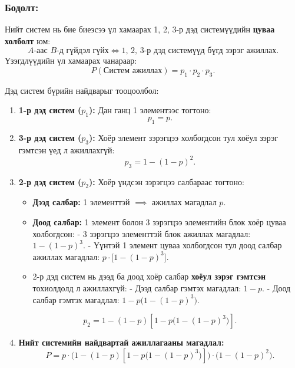 \documentclass[11pt,a4paper]{article}
\begin{document}
\subsubsection*{Бодолт:}

Нийт систем нь бие биеэсээ үл хамаарах 1, 2, 3-р дэд системүүдийн \textbf{цуваа холболт} юм:
\[
  A \text{-аас } B \text{-д гүйдэл гүйх} \iff \text{1, 2, 3-р дэд системүүд бүгд зэрэг ажиллах}.
\]
Үзэгдлүүдийн үл хамаарах чанараар:
\[
  P(\text{Систем ажиллах}) = p_1 \cdot p_2 \cdot p_3.
\]

Дэд систем бүрийн найдварыг тооцоолбол:

\begin{enumerate}[label=\textbf{\arabic*.}, leftmargin=1.4em, itemsep=3pt]
  \item \textbf{1-р дэд систем ($p_1$):}
  Дан ганц 1 элементээс тогтоно:
  \[
    p_1 = p.
  \]

  \item \textbf{3-р дэд систем ($p_3$):}
  Хоёр элемент зэрэгцээ холбогдсон тул хоёул зэрэг гэмтсэн үед л ажиллахгүй:
  \[
    p_3 = 1 - (1 - p)^2.
  \]

  \item \textbf{2-р дэд систем ($p_2$):}
  Хоёр үндсэн зэрэгцээ салбараас тогтоно:
  \begin{itemize}[itemsep=2pt]
    \item \textbf{Дээд салбар:} 1 элементтэй $\implies$ ажиллах магадлал $p$.
    \item \textbf{Доод салбар:} 1 элемент болон 3 зэрэгцээ элементийн блок хоёр цуваа холбогдсон:
      - 3 зэрэгцээ элементтэй блок ажиллах магадлал: $1 - (1 - p)^3$.
      - Үүнтэй 1 элемент цуваа холбогдсон тул доод салбар ажиллах магадлал: $p \cdot \big[1 - (1 - p)^3\big]$.
    \item 2-р дэд систем нь дээд ба доод хоёр салбар \textbf{хоёул зэрэг гэмтсэн} тохиолдолд л ажиллахгүй:
      - Дээд салбар гэмтэх магадлал: $1 - p$.
      - Доод салбар гэмтэх магадлал: $1 - p\big(1 - (1 - p)^3\big)$.
  \end{itemize}
  \[
    p_2 = 1 - (1 - p)\left[1 - p\big(1 - (1 - p)^3\big)\right].
  \]

  \item \textbf{Нийт системийн найдвартай ажиллагааны магадлал:}
  \[
    P = p \cdot \Big(1 - (1 - p)\left[1 - p\big(1 - (1 - p)^3\big)\right]\Big) \cdot \Big(1 - (1 - p)^2\Big).
  \]
\end{enumerate}

\vspace{0.8em}
\end{document}
